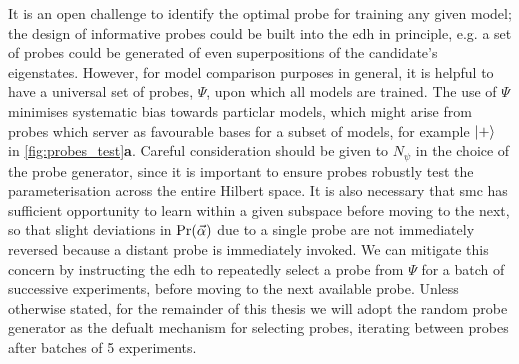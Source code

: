 It is an open challenge to identify the optimal \gls{probe} for training any given model;
    the design of informative probes could be built into the \gls{edh} in principle,
    e.g. a set of \glspl{probe} could be generated of even superpositions of the candidate's eigenstates.
However, for model comparison purposes in general, 
    it is helpful to have a universal set of probes, $\Psi$, upon which all models are trained. 
The use of $\Psi$ minimises systematic bias towards particlar models, 
    which might arise from probes which server as favourable bases for a subset of models, 
    for example $\ket{+}$ in \cref{fig:probes_test}\textbf{a}. 
Careful consideration should be given to $N_{\psi}$ in the choice of the \gls{probe} generator, 
    since it is important to ensure probes robustly test the parameterisation across the entire Hilbert space.
It is also necessary that \gls{smc} has sufficient opportunity to learn within a given subspace before moving to the next, 
    so that slight deviations in $\Pr(\vec{\alpha})$ due to a single probe are not immediately reversed because a distant probe is immediately invoked. 
We can mitigate this concern by instructing the \gls{edh} to repeatedly select a \gls{probe} from $\Psi$ for a batch of successive experiments, 
    before moving to the next available probe. 
Unless otherwise stated, for the remainder of this thesis we will adopt the random \gls{probe} 
    generator as the defualt mechanism for selecting probes,
    iterating between probes after batches of 5 experiments.
